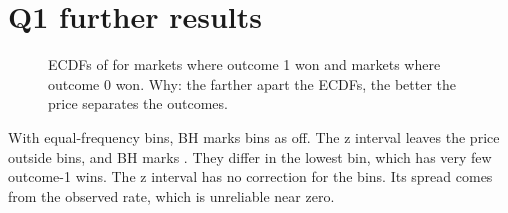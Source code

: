 \section{Q1 further results}\label{sec:app-q1}
\begin{figure}[H]
\centering
{}
\caption{ECDFs of \pOne{} for markets where outcome 1 won and markets where outcome 0 won. Why: the farther apart the ECDFs, the better the price separates the outcomes.}%
\label{fig:ecdf}
\end{figure}

With \QOneEqFreqBins{} equal-frequency bins, BH marks \QOneEqFreqBinsBh{} bins as off.
The z interval leaves the price outside \ZIntervalEqFreqOutsideN{} bins, and BH marks \QOneEqFreqBinsBh.
They differ in the lowest bin, which has very few outcome-1 wins.
The z interval has no correction for the \QOneEqFreqBins{} bins.
Its spread comes from the observed rate, which is unreliable near zero.
